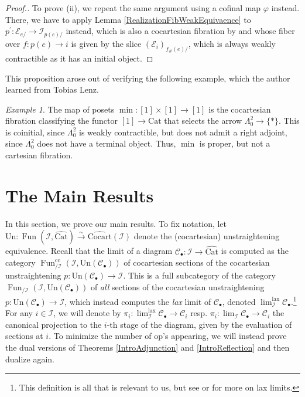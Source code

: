 \documentclass[a4paper,reqno,10pt]{amsart}
\theoremstyle{definition}
\theoremstyle{remark}
\newtheorem{example}[theorem]{Example}
\newcommand{\iso}{\stackrel{\sim}{\rightarrow}}
\newcommand{\C}{\mathcal{C}}
\newcommand{\E}{\mathcal{E}}
\newcommand{\I}{\mathcal{I}}
\newcommand{\Cocart}{\mathrm{Cocart}}
\newcommand{\Fun}{\operatorname{Fun}}
\newcommand{\Un}{\mathrm{Un}}
\newcommand{\Cat}{\mathrm{Cat}}
\newcommand{\lax}{\mathrm{lax}}
\newcommand{\op}{\mathrm{op}}
\newcommand{\cc}{\mathrm{cc}}
\begin{document}
\begin{proof}[Proof.]
To prove (ii), we repeat the same argument using a cofinal map $\varphi$ instead. There, we have to apply Lemma \ref{RealizationFibWeakEquivaence} to $p^{\prime}\colon\E_{e/}\rightarrow\I_{p(e)/}$ instead, which is also a cocartesian fibration by \cite[\href{https://kerodon.net/tag/0477}{Tag 0477}]{kerodon} and whose fiber over $f\colon p(e)\rightarrow i$ is given by the slice $(\E_i)_{f_{\#}(e)/}$, which is always weakly contractible as it has an initial object.
\end{proof}

This proposition arose out of verifying the following example, which the author learned from Tobias Lenz.
\begin{example}\label{TobiasExample}
The map of posets $\min\colon[1]\times[1]\rightarrow[1]$ is the cocartesian fibration classifying the functor $[1]\rightarrow\Cat$ that selects the arrow $\Lambda_0^2\rightarrow\{\ast\}$. This is coinitial, since $\Lambda_0^2$ is weakly contractible, but does not admit a right adjoint, since $\Lambda_0^2$ does not have a terminal object. Thus, $\min$ is proper, but not a cartesian fibration.
\end{example}

\section{The Main Results}

In this section, we prove our main results. To fix notation, let $\Un\colon\Fun(\I,\widehat{\Cat})\iso\widehat{\Cocart}(\I)$ denote the (cocartesian) unstraightening equivalence. Recall that the limit of a diagram $\C_{\bullet}\colon\I\rightarrow\widehat{\Cat}$ is computed as the category $\Fun_{/\I}^{\cc}(\I,\Un(\C_{\bullet}))$ of cocartesian sections of the cocartesian unstraightening $p\colon\Un(\C_{\bullet})\rightarrow\I$. This is a full subcategory of the category $\Fun_{/\I}(\I,\Un(\C_{\bullet}))$ of \textit{all} sections of the cocartesian unstraightening $p\colon\Un(\C_{\bullet})\rightarrow\I$, which instead computes the \textit{lax} limit of $\C_{\bullet}$, denoted $\lim^{\lax}_{\I}\C_{\bullet}$.\footnote{This definition is all that is relevant to us, but see \cite{GHN} or \cite{HHNL} for more on lax limits.} For any $i\in\I$, we will denote by $\pi_i\colon\lim^{\lax}_{\I}\C_{\bullet}\rightarrow\C_i$ resp. $\pi_i\colon\lim_{\I}\C_{\bullet}\rightarrow\C_i$ the canonical projection to the $i$-th stage of the diagram, given by the evaluation of sections at $i$. To minimize the number of $\op$'s appearing, we will instead prove the dual versions of Theorems \ref{IntroAdjunction} and \ref{IntroReflection} and then dualize again.
\end{document}
